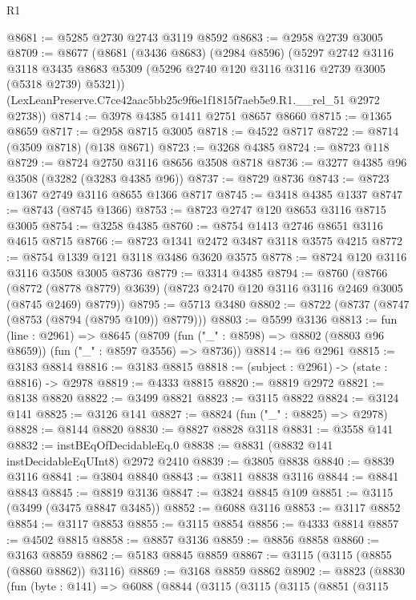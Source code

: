 \begin{lexlean}{R1}
\begin{coremodule}
@8681 := @5285 @2730 @2743 @3119 @8592
@8683 := @2958 @2739 @3005
@8709 := @8677
    (@8681
      (@3436 @8683)
      (@2984 @8596)
      (@5297
        @2742
        @3116
        @3118
        @3435
        @8683
        @5309
        (@5296 @2740 @120 @3116 @3116 @2739 @3005 (@5318 @2739) @5321))
      (LexLeanPreserve.C7ce42aac5bb25c9f6e1f1815f7aeb5e9.R1.__rel_51 @2972 @2738))
@8714 := @3978 @4385 @1411 @2751 @8657 @8660
@8715 := @1365 @8659
@8717 := @2958 @8715 @3005
@8718 := @4522 @8717
@8722 := @8714 (@3509 @8718) (@138 @8671)
@8723 := @3268 @4385
@8724 := @8723 @118
@8729 := @8724 @2750 @3116 @8656 @3508 @8718
@8736 := @3277 @4385 @96 @3508 (@3282 (@3283 @4385 @96))
@8737 := @8729 @8736
@8743 := @8723 @1367 @2749 @3116 @8655 @1366 @8717
@8745 := @3418 @4385 @1337
@8747 := @8743 (@8745 @1366)
@8753 := @8723 @2747 @120 @8653 @3116 @8715 @3005
@8754 := @3258 @4385
@8760 := @8754 @1413 @2746 @8651 @3116 @4615 @8715
@8766 := @8723 @1341 @2472 @3487 @3118 @3575 @4215
@8772 := @8754 @1339 @121 @3118 @3486 @3620 @3575
@8778 := @8724 @120 @3116 @3116 @3508 @3005 @8736
@8779 := @3314 @4385
@8794 := @8760
    (@8766
      (@8772 (@8778 @8779) @3639)
      (@8723 @2470 @120 @3116 @3116 @2469 @3005 (@8745 @2469) @8779))
@8795 := @5713 @3480
@8802 := @8722 (@8737 (@8747 (@8753 (@8794 (@8795 @109)) @8779)))
@8803 := @5599 @3136
@8813 := fun (line : @2961) =>
  @8645 (@8709 (fun ("_" : @8598) => @8802 (@8803 @96 @8659)) (fun ("_" : @8597 @3556) => @8736))
@8814 := @6 @2961
@8815 := @3183 @8814
@8816 := @3183 @8815
@8818 := (subject : @2961) -> (state : @8816) -> @2978
@8819 := @4333 @8815
@8820 := @8819 @2972
@8821 := @8138 @8820
@8822 := @3499 @8821
@8823 := @3115 @8822
@8824 := @3124 @141
@8825 := @3126 @141
@8827 := @8824 (fun ("_" : @8825) => @2978)
@8828 := @8144 @8820
@8830 := @8827 @8828 @3118
@8831 := @3558 @141
@8832 := instBEqOfDecidableEq.{0}
@8838 := @8831 (@8832 @141 instDecidableEqUInt8) @2972 @2410
@8839 := @3805 @8838
@8840 := @8839 @3116
@8841 := @3804 @8840
@8843 := @3811 @8838 @3116
@8844 := @8841 @8843
@8845 := @8819 @3136
@8847 := @3824 @8845 @109
@8851 := @3115 (@3499 (@3475 @8847 @3485))
@8852 := @6088 @3116
@8853 := @3117 @8852
@8854 := @3117 @8853
@8855 := @3115 @8854
@8856 := @4333 @8814
@8857 := @4502 @8815
@8858 := @8857 @3136
@8859 := @8856 @8858
@8860 := @3163 @8859
@8862 := @5183 @8845 @8859
@8867 := @3115 (@3115 (@8855 (@8860 @8862)) @3116)
@8869 := @3168 @8859 @8862
@8902 := @8823
    (@8830
      (fun (byte : @141) =>
      @6088
        (@8844
          (@3115
            (@3115
              (@3115
                (@8851
                  (@3115

\end{coremodule}
\end{lexlean}
